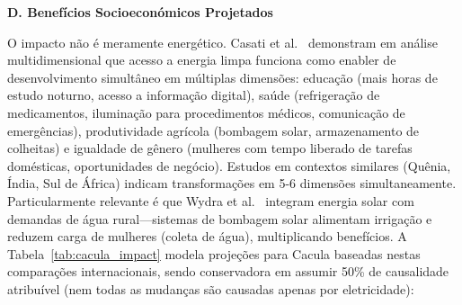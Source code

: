 \documentclass[12pt, a4paper]{article}
\begin{document}
\textbf{D. Benefícios Socioeconómicos Projetados}

O impacto não é meramente energético. Casati et al.~\citep{Casati2023} demonstram em análise multidimensional que acesso a energia limpa funciona como enabler de desenvolvimento simultâneo em múltiplas dimensões: educação (mais horas de estudo noturno, acesso a informação digital), saúde (refrigeração de medicamentos, iluminação para procedimentos médicos, comunicação de emergências), produtividade agrícola (bombagem solar, armazenamento de colheitas) e igualdade de gênero (mulheres com tempo liberado de tarefas domésticas, oportunidades de negócio). Estudos em contextos similares (Quênia, Índia, Sul de África) indicam transformações em 5-6 dimensões simultaneamente. Particularmente relevante é que Wydra et al.~\citep{Wydra2019} integram energia solar com demandas de água rural—sistemas de bombagem solar alimentam irrigação e reduzem carga de mulheres (coleta de água), multiplicando benefícios. A Tabela~\ref{tab:cacula_impact} modela projeções para Cacula baseadas nestas comparações internacionais, sendo conservadora em assumir 50\% de causalidade atribuível (nem todas as mudanças são causadas apenas por eletricidade):
\end{document}
